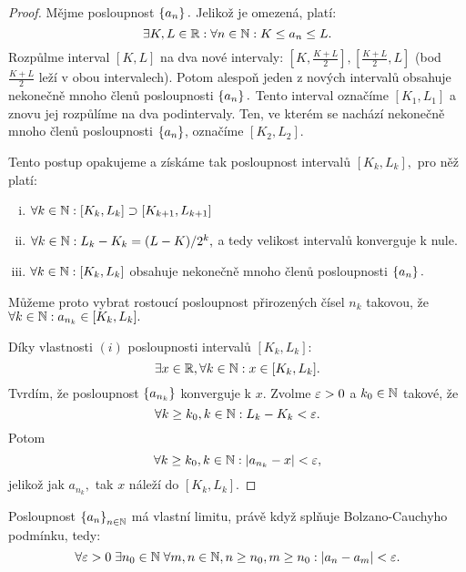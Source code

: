 \begin{proof}
    Mějme posloupnost $\left\{a_n\right\}.$ Jelikož je omezená, platí:
    $$\exists K, L \in \mathbb{R}: \forall n \in \mathbb{N}: K \leq a_n \leq L.$$
    Rozpůlme interval $[K,L]$ na dva nové intervaly: $[K, \frac{K+L}{2}],
    [\frac{K+L}{2}, L]$ (bod $\frac{K+L}{2}$ leží v obou intervalech). 
    Potom alespoň jeden z nových intervalů obsahuje nekonečně mnoho 
    členů posloupnosti $\left\{a_n\right\}.$ Tento interval označíme $[K_1, L_1]$
    a znovu jej rozpůlíme na dva podintervaly. Ten, ve kterém se nachází
    nekonečně mnoho členů posloupnosti $\left\{a_n\right\}$, označíme $[K_2, L_2].$

    Tento postup opakujeme a získáme tak posloupnost intervalů $[K_k, L_k],$ 
    pro něž platí:
    \begin{enumerate}[i.]
        \item $\forall k \in \mathbb{N}: [K_k, L_k] \supset [K_{k+1}, L_{k+1}]$
        \item $\forall k \in \mathbb{N}: L_k - K_k = (L-K)/2^k,$ a tedy velikost intervalů
            konverguje k nule.
        \item $\forall k \in \mathbb{N}: [K_k, L_k]$ obsahuje nekonečně mnoho členů
            posloupnosti $\left\{a_n\right\}.$
    \end{enumerate}
    Můžeme proto vybrat rostoucí posloupnost přirozených čísel $n_k$ takovou, že
    $\forall k \in \mathbb{N}: a_{n_k} \in [K_k, L_k].$ 

    Díky vlastnosti $(i)$ 
    posloupnosti intervalů $[K_k, L_k]:$
    $$\exists x \in \mathbb{R}, \forall k \in \mathbb{N}: x \in [K_k, L_k].$$
    Tvrdím, že posloupnost $\left\{a_{n_k}\right\}$ konverguje k $x.$ Zvolme $\varepsilon > 0$ a
    $k_0 \in \mathbb{N}$ takové, že 
    $$\forall k \geq k_0, k \in \mathbb{N}: L_k - K_k < \varepsilon.$$
    Potom
    $$\forall k \geq k_0, k \in \mathbb{N}: |a_{n_k} - x| < \varepsilon,$$
    jelikož jak $a_{n_k},$ tak $x$ náleží do $[K_k, L_k].$
\end{proof}

\begin{theorem}
    \label{th:bolzanocauchy}
    Posloupnost $\left\{a_n\right\}_{n \in \mathbb{N}}$ má vlastní limitu, právě když
    splňuje Bolzano-Cauchyho podmínku, tedy:
    $$\forall \varepsilon > 0 \; \exists n_0 \in \mathbb{N} \; \forall m,n \in \mathbb{N}, n \geq n_0, m \geq n_0:
    |a_n - a_m| < \varepsilon.$$
\end{theorem}


